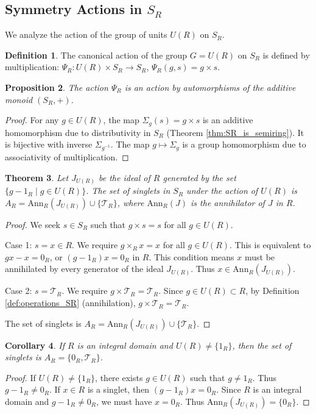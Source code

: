 \documentclass[11pt, a4paper]{article}
\theoremstyle{plain}
\newtheorem{theorem}{Theorem}[section]
\newtheorem{corollary}[theorem]{Corollary}
\newtheorem{proposition}[theorem]{Proposition}
\theoremstyle{definition}
\newtheorem{definition}[theorem]{Definition}
\numberwithin{equation}{section}
\newcommand{\Tobj}{\mathcal{T}} %
\newcommand{\SR}{S_{R}}
\begin{document}
\subsection{Symmetry Actions in \texorpdfstring{$\SR$}{S\_R}}

We analyze the action of the group of units $U(R)$ on $\SR$.

\begin{definition}
The canonical action of the group $G=U(R)$ on $\SR$ is defined by multiplication: $\Psi_R: U(R) \times \SR \to \SR$, $\Psi_R(g, s) = g \times s$.
\end{definition}

\begin{proposition}
The action $\Psi_R$ is an action by automorphisms of the additive monoid $(\SR, +)$.
\end{proposition}
\begin{proof}
For any $g \in U(R)$, the map $\Sigma_g(s) = g \times s$ is an additive homomorphism due to distributivity in $\SR$ (Theorem \ref{thm:SR_is_semiring}). It is bijective with inverse $\Sigma_{g^{-1}}$. The map $g \mapsto \Sigma_g$ is a group homomorphism due to associativity of multiplication.
\end{proof}

\begin{theorem}\label{thm:singlets_SR}
Let $J_{U(R)}$ be the ideal of $R$ generated by the set $\{g-1_R \mid g \in U(R)\}$. The set of singlets in $\SR$ under the action of $U(R)$ is $A_R = \mathrm{Ann}_R(J_{U(R)}) \cup \{\Tobj_R\}$, where $\mathrm{Ann}_R(J)$ is the annihilator of $J$ in $R$.
\end{theorem}
\begin{proof}
We seek $s \in \SR$ such that $g\times s = s$ for all $g \in U(R)$.

Case 1: $s=x \in R$. We require $g\times_{R} x = x$ for all $g \in U(R)$. This is equivalent to $gx-x=0_R$, or $(g-1_R)x=0_R$ in $R$.
This condition means $x$ must be annihilated by every generator of the ideal $J_{U(R)}$. Thus $x \in \mathrm{Ann}_R(J_{U(R)})$.

Case 2: $s=\Tobj_R$. We require $g\times \Tobj_R = \Tobj_R$.
Since $g \in U(R) \subset R$, by Definition \ref{def:operations_SR} (annihilation), $g\times \Tobj_R = \Tobj_R$.

The set of singlets is $A_R = \mathrm{Ann}_R(J_{U(R)}) \cup \{\Tobj_R\}$.
\end{proof}

\begin{corollary}
If $R$ is an integral domain and $U(R) \neq \{1_R\}$, then the set of singlets is $A_R = \{0_R, \Tobj_R\}$.
\end{corollary}
\begin{proof}
If $U(R) \neq \{1_R\}$, there exists $g \in U(R)$ such that $g \neq 1_R$. Thus $g-1_R \neq 0_R$.
If $x \in R$ is a singlet, then $(g-1_R)x=0_R$. Since $R$ is an integral domain and $g-1_R \neq 0_R$, we must have $x=0_R$. Thus $\mathrm{Ann}_R(J_{U(R)}) = \{0_R\}$.
\end{proof}
\end{document}
